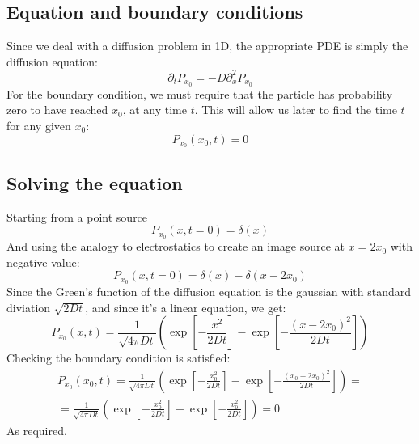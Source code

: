 \documentclass{article}
\begin{document}
\subsection{Equation and boundary conditions}
Since we deal with a diffusion problem in 1D, the appropriate PDE is simply the diffusion equation:
\begin{equation}
    \partial_t  P_{x_0} = -D \partial_x^2 P_{x_0}
\end{equation}
For the boundary condition, we must require that the particle has probability zero to have reached $x_0$, at any time $t$. This will allow us later to find the time $t$ for any given $x_0$:
\begin{equation}
    P_{x_0}(x_0, t) = 0
\end{equation}
\subsection{Solving the equation}
Starting from a point source
\begin{equation}
    P_{x_0}(x, t=0) = \delta(x)
\end{equation}
And using the analogy to electrostatics to create an image source at $x = 2x_0$ with negative value:
\begin{equation}
    P_{x_0}(x, t=0) = \delta(x) - \delta(x - 2x_0)
\end{equation}
Since the Green's function of the diffusion equation is the gaussian with standard diviation $\sqrt{2Dt}$, and since it's a linear equation, we get:
\begin{equation}
    P_{x_0}(x, t) = \frac{1}{\sqrt{4\pi Dt}}\left(
        \exp[-\frac{x^2}{2Dt}] - \exp[-\frac{(x - 2x_0)^2}{2Dt}]
    \right)
\end{equation}
Checking the boundary condition is satisfied:
\begin{equation}
\begin{gathered}
    P_{x_0}(x_0, t) = \frac{1}{\sqrt{4\pi Dt}}\left(
        \exp[-\frac{x_0^2}{2Dt}] - \exp[-\frac{(x_0 - 2x_0)^2}{2Dt}]
    \right) = \\ = \frac{1}{\sqrt{4\pi Dt}}\left(
        \exp[-\frac{x_0^2}{2Dt}] - \exp[-\frac{x_0^2}{2Dt}]
    \right) = 0
\end{gathered}
\end{equation}
As required.
\end{document}
